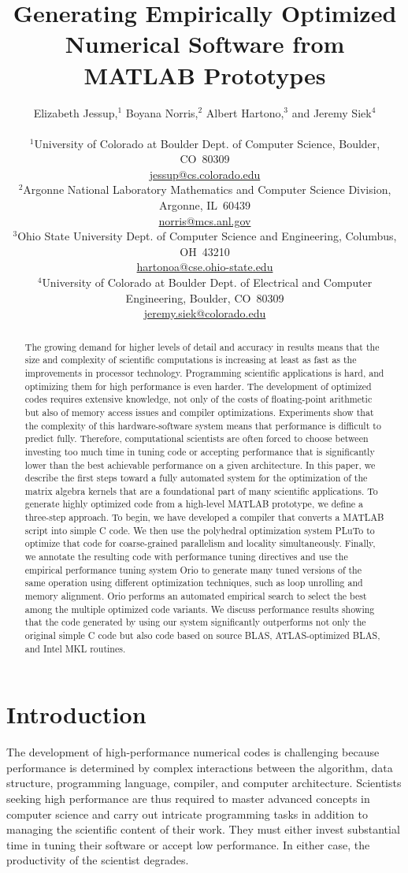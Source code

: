 \documentclass[11pt]{article}
\title{Generating Empirically Optimized Numerical Software from MATLAB Prototypes}
\author{
Elizabeth Jessup,$^1$ Boyana Norris,$^2$ Albert Hartono,$^3$ and Jeremy Siek$^4$\\
\\
\vspace{-.05in}
{\small $^1$University of Colorado at Boulder Dept. of Computer Science, Boulder, CO~80309}\\
\vspace{-.05in}
{\small \url{jessup@cs.colorado.edu}}\\
\vspace{-.05in}
{\small $^2$Argonne National Laboratory Mathematics and Computer Science Division, Argonne, IL~60439}\\
\vspace{-.05in}
{\small \url{norris@mcs.anl.gov}}\\
\vspace{-.05in}
{\small $^3$Ohio State University Dept. of Computer Science and Engineering, Columbus, OH~43210}\\
\vspace{-.05in}
{\small \url{hartonoa@cse.ohio-state.edu}}\\
\vspace{-.05in}
{\small $^4$University of Colorado at Boulder Dept. of Electrical and Computer Engineering, Boulder, CO~80309}\\
\vspace{-.05in}
{\small \url{jeremy.siek@colorado.edu}}
}
\begin{document}
\maketitle
%
\onehalfspacing
\begin{abstract}
The growing demand for higher levels of detail and accuracy in results means that the size and complexity of scientific computations is increasing at least as fast as the improvements in processor technology. Programming scientific applications is hard, and optimizing them for high performance is even harder.  The development of optimized codes requires extensive knowledge, not only of the costs of floating-point arithmetic but also of  memory access issues and compiler optimizations. Experiments show that the complexity of this hardware-software system means that performance is difficult to predict fully.  Therefore, computational scientists are often forced to choose between investing too much time in tuning code or  accepting performance that is significantly lower than the best achievable performance on a given architecture.
In this paper, we describe the first steps toward a fully automated system for the optimization of the matrix algebra kernels that are a foundational part of many scientific applications.  To generate highly optimized code from a high-level MATLAB prototype, we define a three-step approach.  To begin, we have developed a compiler that converts a MATLAB script into simple C code.   We then use the polyhedral optimization system PLuTo to optimize that code for coarse-grained parallelism and locality simultaneously. Finally, we annotate the resulting code with performance tuning directives and use the empirical performance tuning system Orio to generate many tuned versions of the same operation using different optimization techniques, such as loop unrolling and memory alignment. Orio performs an automated empirical search to select the best among the multiple optimized code variants. 
We discuss performance results showing that the code generated by using our system significantly outperforms not only the original simple C code but also code based on source BLAS, ATLAS-optimized BLAS, and Intel MKL routines.
\end{abstract}
%
\doublespacing
%
\section{Introduction}
\label{sec:intro}

The development of high-performance numerical codes is challenging because performance is determined by complex interactions between the algorithm, data structure, programming language, compiler, and computer architecture. Scientists seeking high performance are thus required to master advanced concepts in computer science and carry out intricate programming tasks in addition to managing the scientific content of their work.  They must either invest substantial time in tuning their software or accept low performance. In either case, the productivity of the scientist degrades.
\end{document}
